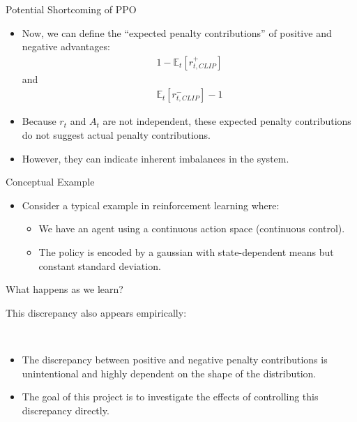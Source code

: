 \documentclass{beamer}
\begin{document}
\begin{frame}{Potential Shortcoming of PPO}
\begin{itemize}
        \framebreak
        \item Now, we can define the ``expected penalty contributions'' of
            positive and negative advantages:
        \begin{align*}
            1 - \mathbb{E}_t[r_{t, CLIP}^+]
        \end{align*}
        and
        \begin{align*}
            \mathbb{E}_t[r_{t, CLIP}^-] - 1
        \end{align*}
        \item Because $r_t$ and $A_t$ are not independent, these expected
            penalty contributions do not suggest actual penalty contributions.
        \item However, they can indicate inherent imbalances in the system.
    \end{itemize}
    \framebreak
    Conceptual Example
    \begin{itemize}
        \item Consider a typical example in reinforcement learning where:
            \begin{itemize}
                \item We have an agent using a continuous action
                    space (continuous control).
                \item The policy is encoded by a gaussian with state-dependent
                    means but constant standard deviation.
            \end{itemize}
    \end{itemize}
    \framebreak
    What happens as we learn?\\
    \begin{center}
    \end{center}
    \framebreak
    This discrepancy also appears empirically:
    \begin{center}
        \scalebox{0.6}{}\\
    \end{center}
    \framebreak
    \begin{itemize}
        \item The discrepancy between positive and negative penalty
            contributions is unintentional and highly dependent on the shape of
            the distribution.
        \item The goal of this project is to investigate the effects of
            controlling this discrepancy directly.
    \end{itemize}
\end{frame}
\end{document}

